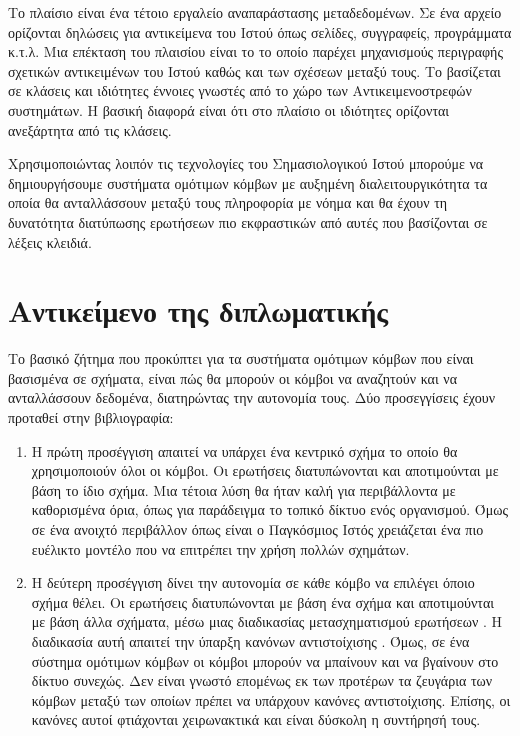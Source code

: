 Το πλαίσιο  είναι ένα τέτοιο εργαλείο αναπαράστασης
μεταδεδομένων. Σε ένα  αρχείο ορίζονται δηλώσεις για
αντικείμενα του Ιστού όπως σελίδες, συγγραφείς, προγράμματα κ.τ.λ.
Μια επέκταση του πλαισίου  είναι το  το
οποίο παρέχει μηχανισμούς περιγραφής σχετικών αντικειμένων του
Ιστού καθώς και των σχέσεων μεταξύ τους. Το 
βασίζεται σε κλάσεις και ιδιότητες έννοιες γνωστές από το χώρο των
Αντικειμενοστρεφών συστημάτων. Η βασική διαφορά είναι ότι στο
πλαίσιο  οι ιδιότητες ορίζονται ανεξάρτητα από τις
κλάσεις.

Χρησιμοποιώντας λοιπόν τις τεχνολογίες του Σημασιολογικού Ιστού
μπορούμε να δημιουργήσουμε συστήματα ομότιμων κόμβων με αυξημένη
διαλειτουργικότητα τα οποία θα ανταλλάσσουν μεταξύ τους πληροφορία
με νόημα και θα έχουν τη δυνατότητα διατύπωσης ερωτήσεων πιο
εκφραστικών από αυτές που βασίζονται σε λέξεις κλειδιά.


\section{Αντικείμενο της διπλωματικής}
Το βασικό ζήτημα που προκύπτει για τα συστήματα ομότιμων κόμβων
που είναι βασισμένα σε σχήματα, είναι πώς θα μπορούν οι κόμβοι να
αναζητούν και να ανταλλάσσουν δεδομένα, διατηρώντας την αυτονομία
τους. Δύο προσεγγίσεις έχουν προταθεί στην βιβλιογραφία:
\begin{enumerate}
\item Η πρώτη προσέγγιση απαιτεί να υπάρχει ένα κεντρικό σχήμα το
οποίο θα χρησιμοποιούν όλοι οι κόμβοι. Οι
ερωτήσεις διατυπώνονται και αποτιμούνται με βάση το ίδιο σχήμα.
Μια τέτοια λύση θα ήταν καλή για περιβάλλοντα με καθορισμένα όρια,
όπως για παράδειγμα το τοπικό δίκτυο ενός οργανισμού. Όμως σε ένα
ανοιχτό περιβάλλον όπως είναι ο Παγκόσμιος Ιστός χρειάζεται ένα
πιο ευέλικτο μοντέλο που να επιτρέπει την χρήση πολλών σχημάτων.
\item Η δεύτερη προσέγγιση δίνει την αυτονομία σε κάθε κόμβο να επιλέγει όποιο σχήμα θέλει.
Οι ερωτήσεις διατυπώνονται με βάση ένα σχήμα και αποτιμούνται με
βάση άλλα σχήματα, μέσω μιας διαδικασίας μετασχηματισμού ερωτήσεων
. Η διαδικασία αυτή απαιτεί την ύπαρξη
κανόνων αντιστοίχισης  \cite{Piazza}. Όμως, σε
ένα σύστημα ομότιμων κόμβων οι κόμβοι μπορούν να μπαίνουν και να
βγαίνουν στο δίκτυο συνεχώς. Δεν είναι γνωστό επομένως εκ των
προτέρων τα ζευγάρια των κόμβων μεταξύ των οποίων πρέπει να
υπάρχουν κανόνες αντιστοίχισης. Επίσης, οι κανόνες αυτοί
φτιάχονται χειρωνακτικά και είναι δύσκολη η συντήρησή τους.
\end{enumerate}


